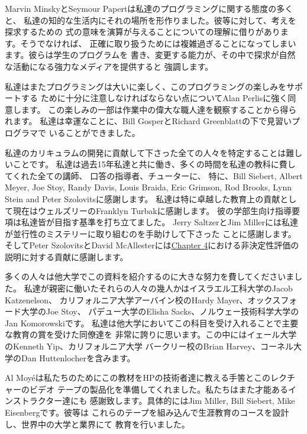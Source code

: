 \documentclass[oneside]{book}
\newcommand{\link}[1]{\hyperref[#1]{#1}}
\begin{document}
Marvin MinskyとSeymour Papertは私達のプログラミングに関する態度の多くと、
私達の知的な生活内にそれの場所を形作りました。彼等に対して、考えを探求するための
式の意味を演算が与えることについての理解に借りがあります。そうでなければ、
正確に取り扱うためには複雑過ぎることになってしまいます。彼らは学生のプログラムを
書き、変更する能力が、その中で探求が自然な活動になる強力なメディアを提供すると
強調します。



私達はまたプログラミングは大いに楽しく、このプログラミングの楽しみをサポートする
ために十分に注意しなければならない点についてAlan Perlisに強く同意します。
この楽しみの一部は作業中の偉大な職人達を観察することから得られます。
私達は幸運なことに、Bill GosperとRichard Greenblattの下で見習いプログラマで
いることができました。



私達のカリキュラムの開発に貢献して下さった全ての人々を特定することは難しいことです。
私達は過去15年私達と共に働き、多くの時間を私達の教科に費してくれた全ての講師、
口答の指導者、チューターに、
特に、Bill Siebert, Albert Meyer,
Joe Stoy, Randy Davis, Louis Braida, Eric Grimson, Rod Brooks, Lynn Stein and
Peter Szolovitsに感謝します。
私達は特に卓越した教育上の貢献として現在はウェルズリーのFranklyn Turbakに感謝します。
彼の学部生向け指導要項は私達皆が目指す基準を打ち立てました。
Jerry SaltzerとJim Millerには私達が並行性のミステリーに取り組むのを手助けして下さった
ことに感謝します。そしてPeter SzolovitsとDavid McAllesterには\link{Chapter
4}における非決定性評価の説明に対する貢献に感謝します。



多くの人々は他大学でこの資料を紹介するのに大きな努力を費してくださいました。
私達が親密に働いたそれらの人々の幾人かはイスラエル工科大学のJacob Katzenelson、
カリフォルニア大学アーバイン校のHardy Mayer、オックスフォード大学のJoe Stoy、
パデュー大学のElisha Sacks、ノルウェー技術科学大学のJan Komorowskiです。
私達は他大学においてこの科目を受け入れることで主要な教育の賞を受けた同僚達を
非常に誇りに思います。この中にはイェール大学のKenneth Yip、カリフォルニア大学
バークリー校のBrian Harvey、コーネル大学のDan Huttenlocherを含みます。


Al Moy\'eは私たちのためにこの教材をHPの技術者達に教える手筈とこのレクチャーのビデオ
テープの製品化を準備してくれました。私たちはまた才能あるインストラクター達にも
感謝致します。具体的にはJim Miller, Bill Siebert, Mike Eisenbergです。彼等は
これらのテープを組み込んで生涯教育のコースを設計し、世界中の大学と業界にて
教育を行いました。
\end{document}

